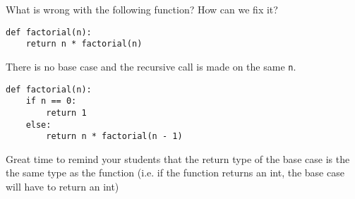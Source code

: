 \pagebreak
\begin{blocksection}
\question What is wrong with the following function? How can we fix it?

\begin{lstlisting}
def factorial(n):
    return n * factorial(n)
\end{lstlisting}

\begin{solution}[1in]
There is no base case and the recursive call is made on the same \lstinline{n}.

\begin{lstlisting}
def factorial(n):
    if n == 0:
        return 1
    else:
        return n * factorial(n - 1)
\end{lstlisting}
\end{solution}

\begin{questionmeta}
    Great time to remind your students that the return type of the base case is the
     the same type as the function (i.e. if the function returns an int, the base case will have to return an int)
\end{questionmeta}
\end{blocksection}
